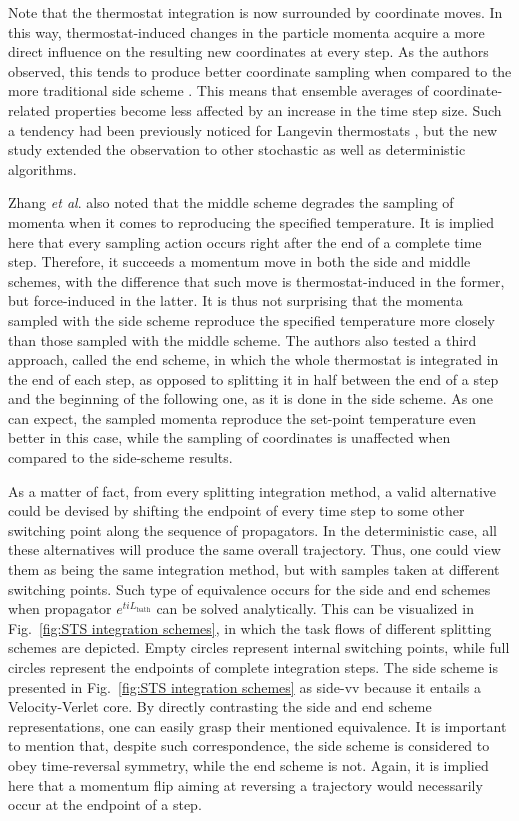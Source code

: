 \documentclass[
    journal=jctcce,
    layout=twocolumn
]{achemso}
\newcommand{\Liu}{i\!L}
\begin{document}
Note that the thermostat integration is now surrounded by coordinate moves.
In this way, thermostat-induced changes in the particle momenta acquire a more direct influence on the resulting new coordinates at every step.
As the authors observed, this tends to produce better coordinate sampling when compared to the more traditional side scheme \cite{Zhang_2017}.
This means that ensemble averages of coordinate-related properties become less affected by an increase in the time step size.
Such a tendency had been previously noticed for Langevin thermostats \cite{Leimkuhler_2012, Leimkuhler_2013_2}, but the new study extended the observation to other stochastic as well as deterministic algorithms.

Zhang \textit{et al}. \cite{Zhang_2017} also noted that the middle scheme degrades the sampling of momenta when it comes to reproducing the specified temperature.
It is implied here that every sampling action occurs right after the end of a complete time step.
Therefore, it succeeds a momentum move in both the side and middle schemes, with the difference that such move is thermostat-induced in the former, but force-induced in the latter.
It is thus not surprising that the momenta sampled with the side scheme reproduce the specified temperature more closely than those sampled with the middle scheme.
The authors also tested a third approach, called the end scheme, in which the whole thermostat is integrated in the end of each step, as opposed to splitting it in half between the end of a step and the beginning of the following one, as it is done in the side scheme.
As one can expect, the sampled momenta reproduce the set-point temperature even better in this case, while the sampling of coordinates is unaffected when compared to the side-scheme results.

As a matter of fact, from every splitting integration method, a valid alternative could be devised by shifting the endpoint of every time step to some other switching point along the sequence of propagators.
In the deterministic case, all these alternatives will produce the same overall trajectory.
Thus, one could view them as being the same integration method, but with samples taken at different switching points.
Such type of equivalence occurs for the side and end schemes when propagator $e^{t \Liu_\mathrm{bath}}$ can be solved analytically.
This can be visualized in Fig.~\ref{fig:STS integration schemes}, in which the task flows of different splitting schemes are depicted.
Empty circles represent internal switching points, while full circles represent the endpoints of complete integration steps.
The side scheme is presented in Fig.~\ref{fig:STS integration schemes} as side-vv because it entails a Velocity-Verlet core.
By directly contrasting the side and end scheme representations, one can easily grasp their mentioned equivalence.
It is important to mention that, despite such correspondence, the side scheme is considered to obey time-reversal symmetry, while the end scheme is not.
Again, it is implied here that a momentum flip aiming at reversing a trajectory would necessarily occur at the endpoint of a step.
\end{document}
